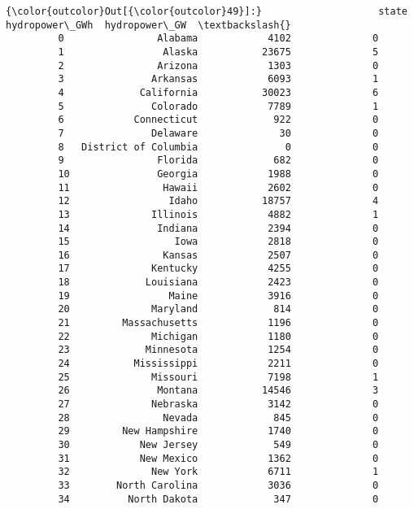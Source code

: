 \documentclass[11pt]{article}
\begin{document}
\begin{Verbatim}[commandchars=\\\{\}]
{\color{outcolor}Out[{\color{outcolor}49}]:}                    state  hydropower\_GWh  hydropower\_GW  \textbackslash{}
         0                Alabama            4102              0   
         1                 Alaska           23675              5   
         2                Arizona            1303              0   
         3               Arkansas            6093              1   
         4             California           30023              6   
         5               Colorado            7789              1   
         6            Connecticut             922              0   
         7               Delaware              30              0   
         8   District of Columbia               0              0   
         9                Florida             682              0   
         10               Georgia            1988              0   
         11                Hawaii            2602              0   
         12                 Idaho           18757              4   
         13              Illinois            4882              1   
         14               Indiana            2394              0   
         15                  Iowa            2818              0   
         16                Kansas            2507              0   
         17              Kentucky            4255              0   
         18             Louisiana            2423              0   
         19                 Maine            3916              0   
         20              Maryland             814              0   
         21         Massachusetts            1196              0   
         22              Michigan            1180              0   
         23             Minnesota            1254              0   
         24           Mississippi            2211              0   
         25              Missouri            7198              1   
         26               Montana           14546              3   
         27              Nebraska            3142              0   
         28                Nevada             845              0   
         29         New Hampshire            1740              0   
         30            New Jersey             549              0   
         31            New Mexico            1362              0   
         32              New York            6711              1   
         33        North Carolina            3036              0   
         34          North Dakota             347              0   

\end{Verbatim}
\end{document}
